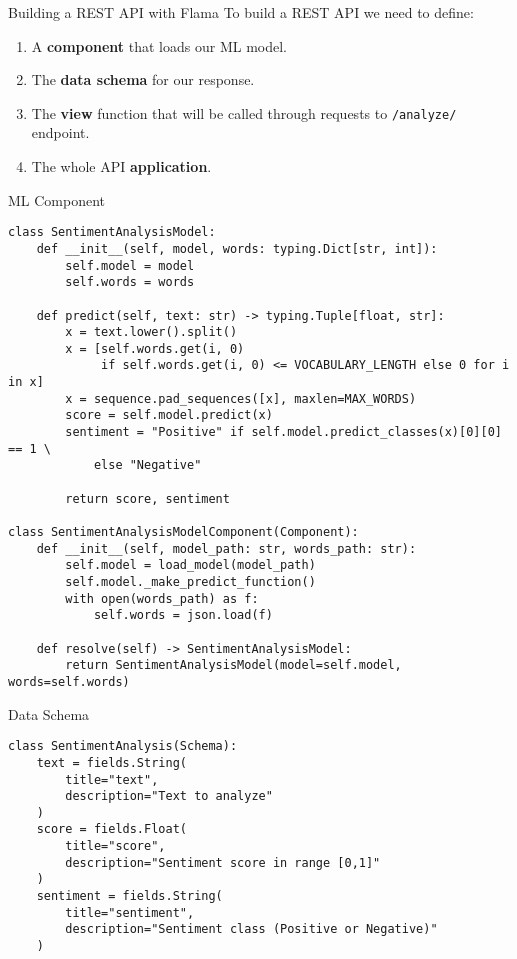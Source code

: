 \begin{frame}{Building a REST API with Flama}
    To build a REST API we need to define:

    \begin{enumerate}[<+->]
        \item A \textbf{component} that loads our ML model.
        \item The \textbf{data schema} for our response.
        \item The \textbf{view} function that will be called through requests to \texttt{/analyze/} endpoint.
        \item The whole API \textbf{application}.
    \end{enumerate}

\end{frame}

\begin{frame}[fragile]{ML Component}
    \begin{verbatim}
class SentimentAnalysisModel:
    def __init__(self, model, words: typing.Dict[str, int]):
        self.model = model
        self.words = words

    def predict(self, text: str) -> typing.Tuple[float, str]:
        x = text.lower().split()
        x = [self.words.get(i, 0)
             if self.words.get(i, 0) <= VOCABULARY_LENGTH else 0 for i in x]
        x = sequence.pad_sequences([x], maxlen=MAX_WORDS)
        score = self.model.predict(x)
        sentiment = "Positive" if self.model.predict_classes(x)[0][0] == 1 \
            else "Negative"

        return score, sentiment

class SentimentAnalysisModelComponent(Component):
    def __init__(self, model_path: str, words_path: str):
        self.model = load_model(model_path)
        self.model._make_predict_function()
        with open(words_path) as f:
            self.words = json.load(f)

    def resolve(self) -> SentimentAnalysisModel:
        return SentimentAnalysisModel(model=self.model, words=self.words)
    \end{verbatim}
\end{frame}

\begin{frame}[fragile]{Data Schema}
    \begin{verbatim}
class SentimentAnalysis(Schema):
    text = fields.String(
        title="text",
        description="Text to analyze"
    )
    score = fields.Float(
        title="score",
        description="Sentiment score in range [0,1]"
    )
    sentiment = fields.String(
        title="sentiment",
        description="Sentiment class (Positive or Negative)"
    )
    \end{verbatim}
\end{frame}

